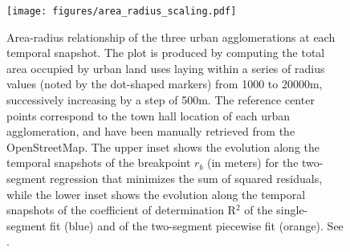 \begin{figure}[!ht]
  \begin{adjustwidth}{0cm}{-.4\textwidth}
    \centering
    \texttt{[image: figures/area\_radius\_scaling.pdf]}
    \vspace{.5em}
    \caption[Area-radius scaling]{\label{figures/area_radius_scaling.pdf}Area-radius relationship of the three urban agglomerations at each temporal snapshot. The plot is produced by computing the total area occupied by urban land uses laying within a series of radius values (noted by the dot-shaped markers) from 1000 to 20000m, successively increasing by a step of 500m. The reference center points correspond to the town hall location of each urban agglomeration, and have been manually retrieved from the OpenStreetMap\footnotemark. %
    The upper inset shows the evolution along the temporal snapshots of the breakpoint $r_b$ (in meters) for the two-segment regression that minimizes the sum of squared residuals, while the lower inset shows the evolution along the temporal snapshots of the coefficient of determination R$^2$ of the single-segment fit (blue) and of the two-segment piecewise fit (orange). See .}
  \end{adjustwidth}
\end{figure}


